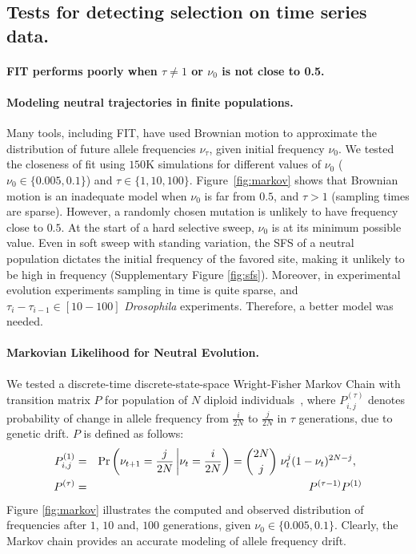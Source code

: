 \documentclass[11pt]{article}
\begin{document}
\subsection{Tests for detecting selection on time series data.}
\paragraph{FIT performs poorly when $\tau \neq 1$ or $\nu_0$ is not close to 
0.5.}
\paragraph{Modeling neutral trajectories in finite populations.} Many
tools, including FIT, have used Brownian motion to approximate the
distribution of future allele frequencies $\nu_{\tau}$, given initial
frequency $\nu_0$. We tested the closeness of fit using $150$K
simulations for different values of $\nu_0$ ($\nu_0\in\{0.005,0.1\}$)
and $\tau\in \{1,10,100\}$. Figure~\ref{fig:markov} shows that
Brownian motion is an inadequate model when $\nu_0$ is far from $0.5$,
and $\tau>1$ (sampling times are sparse). However, a randomly chosen
mutation is unlikely to have frequency close to $0.5$. At the start of
a hard selective sweep, $\nu_0$ is at its minimum possible value. Even
in soft sweep with standing variation, the SFS of a neutral population
dictates the initial frequency of the favored site, making it unlikely
to be high in frequency (Supplementary Figure
\ref{fig:sfs}). Moreover, in experimental evolution experiments
sampling in time is quite sparse, and $\tau_i-\tau_{i-1}\in [10-100]$
\emph{Drosophila} experiments. Therefore, a better model was needed.

\paragraph{Markovian Likelihood for Neutral Evolution.}
We tested a discrete-time discrete-state-space Wright-Fisher Markov
Chain with transition matrix $P$ for population of $N$ diploid
individuals~\cite{Ewens2012Mathematical}, where $P^{(\tau)}_{i,j}$
denotes probability of change in allele frequency from $\frac{i}{2N}$
to $\frac{j}{2N}$ in $\tau$ generations, due to genetic drift. $P$ is
defined as follows:
\begin{eqnarray}
  P^{(1)}_{i,j} &=& \operatorname{Pr}\left(\nu_{t+1}=\frac{j}{2N} \left|
      \nu_{t}=\frac{i}{2N}\right)={2N \choose j} \right.  \nu_{t}^j
  (1-\nu_{t})^{2N-j}, \;\;\\
  P^{(\tau)} &=&   P^{(\tau-1)}P^{(1)}\\
\end{eqnarray}
Figure \ref{fig:markov} illustrates the computed and observed
distribution of frequencies after $1$, $10$ and, $100$ generations,
given $\nu_0\in\{0.005,0.1\}$. Clearly, the Markov chain provides an
accurate modeling of allele frequency drift.
\end{document}
